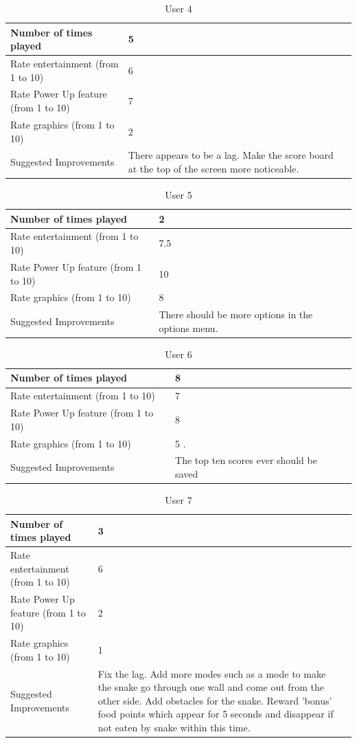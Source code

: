 \documentclass[12pt]{article}
\begin{document}
\begin{center}
	\begin{longtable}{ | l | p{8cm} | p{8cm}|}
	\caption{User 4} \\ \hline \label{TblUsr4} 
	Number of times played & 5 \\ \hline
	Rate entertainment (from 1 to 10) & 6 \\ \hline
	Rate Power Up feature (from 1 to 10) & 7 \\ \hline
	Rate graphics (from 1 to 10) & 2  \\ \hline
	Suggested Improvements & There appears to be a lag. Make the score board at the top of the screen more noticeable.\\ \hline
	\end{longtable}

	\begin{longtable}{ | l | p{8cm} | p{8cm}|}
	\caption{User 5} \\ \hline \label{TblUsr5} 
	Number of times played & 2 \\ \hline
	Rate entertainment (from 1 to 10) & 7.5 \\ \hline
	Rate Power Up feature (from 1 to 10) & 10 \\ \hline
	Rate graphics (from 1 to 10) & 8 \\ \hline
	Suggested Improvements & There should be more options in the options menu. \\ \hline
	\end{longtable}

	\begin{longtable}{ | l | p{8cm} | p{8cm}|}
	\caption{User 6}  \\ \hline \label{TblUsr6} 
	Number of times played &  8 \\ \hline
	Rate entertainment (from 1 to 10) & 7 \\ \hline
	Rate Power Up feature (from 1 to 10) & 8 \\ \hline
	Rate graphics (from 1 to 10) & 5  .\\ \hline
	Suggested Improvements & The top ten scores ever should be saved \\ \hline
	\end{longtable}

	\begin{longtable}{ | l | p{8cm} | p{8cm}|}
	\caption{User 7} \\ \hline \label{TblUsr7} 
	Number of times played & 3 \\ \hline
	Rate entertainment (from 1 to 10) & 6 \\ \hline
	Rate Power Up feature (from 1 to 10) & 2 \\ \hline
	Rate graphics (from 1 to 10) & 1 \\ \hline
	Suggested Improvements & Fix the lag. Add more modes such as a 			mode to make the snake go through one wall and come out from the 		other side. Add obstacles for the snake. Reward 'bonus' food 			points which appear for 5 seconds and disappear if not eaten by 		snake within this time. \\ \hline
	\end{longtable}
\end{center}
\end{document}
